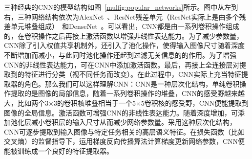 三种经典的CNN的模型结构如图~\ref{mulfig:popular_networks}所示。图中从左到右，三种网络结构依次为AlexNet~\cite{krizhevsky2012imagenet}、ResNet残差单元（ResNet实际上是由多个残差单元堆叠组成）~\cite{he2016deep, he2016identity}和DenseNet~\cite{huang2017densely}。可以看出，CNN都是由一系列卷积操作组成的，在卷积操作之后再接上激活函数以增强非线性表达能力。为了减少参数量，CNN除了引入权值共享机制外，还引入了池化操作，使得输入图像尺寸随着深度不断增加而减小，与此同时池化操作还起到过滤无关信息的的作用。为了增强CNN的非线性表达能力，可在CNN中添加激活函数。最后，再接上全连接层对提取到的特征进行分类（视不同任务而改变）。在此过程中，CNN实际上充当特征提取器的角色。那么我们可以这样理解CNN：CNN是一种层次化结构，单纯卷积操作提取的是图像的局部信息，随着一系列卷积操作的堆叠，CNN的感受野越来越大，比如两个3$\times$3的卷积核堆叠相当于一个5$\times$5卷积核的感受野，CNN便能提取到图像的全局信息。激活函数可增强CNN的非线性表达能力。随着深度增加，可添加池化层减小卷积层的输入尺寸从而减少网络参数量。采用这种层次化结构，CNN可逐步提取到输入图像与特定任务相关的高层语义特征。在损失函数（比如交叉熵）的监督指导下，运用梯度反向传播算法计算梯度更新网络参数，CNN便能被训练成一个良好的特征提取器。
